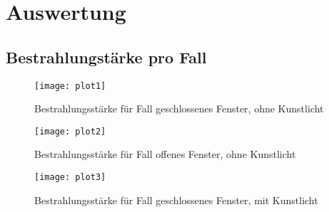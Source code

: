 \section{Auswertung}
\label{sec:Auswertung}
\subsection{Bestrahlungstärke pro Fall}
\begin{figure}[H]
    \centering
    \texttt{[image: plot1]}
    \caption{Bestrahlungsstärke für Fall geschlossenes Fenster, ohne Kunstlicht}
    \label{fig:plot1_28062023}
  \end{figure}
 
  \begin{figure}[H]
    \centering
    \texttt{[image: plot2]}
    \caption{Bestrahlungsstärke für Fall offenes Fenster, ohne Kunstlicht}
    \label{fig:plot2_28062023}
  \end{figure}

  \begin{figure}[H]
    \centering
    \texttt{[image: plot3]}
    \caption{Bestrahlungsstärke für Fall geschlossenes Fenster, mit Kunstlicht}
    \label{fig:plot3_28062023}
  \end{figure}
\newpage
